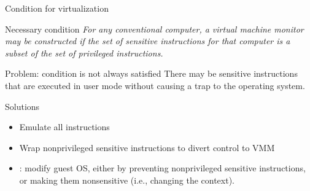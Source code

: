   \begin{slide}{Condition for virtualization}
    \begin{alertblock}{Necessary condition}
      \itshape For any conventional computer, a virtual machine monitor may be constructed if the set of
      sensitive instructions for that computer is a subset of the set of privileged instructions.
    \end{alertblock}
    \begin{block}{Problem: condition is not always satisfied}
      There may be sensitive instructions that are executed in user mode without causing a trap to the
      operating system.
    \end{block}
    \begin{block}{Solutions}
      \begin{itemize}
      \item Emulate all instructions
      \item Wrap nonprivileged sensitive instructions to divert control to VMM
      \item {}: modify guest OS, either by preventing nonprivileged sensitive
        instructions, or making them nonsensitive (i.e., changing the context).
      \end{itemize}
    \end{block}
  \end{slide}
